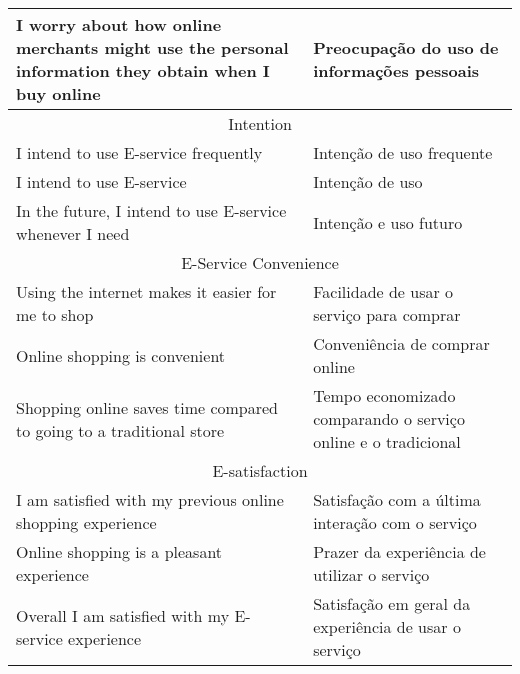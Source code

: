 \begin{apendicesenv}
\begin{table}[]
{\begin{tabular}{|l|l|}
I worry about how online merchants might use the personal information they obtain when I buy online & Preocupação do uso de informações pessoais \\ \hline
\multicolumn{2}{|c|}{\cellcolor[HTML]{C0C0C0}Intention} \\ \hline
I intend to use E-service frequently & Intenção de uso frequente \\ \hline
I intend to use E-service & Intenção de uso \\ \hline
In the future, I intend to use E-service whenever I need & Intenção e uso futuro \\ \hline
\multicolumn{2}{|c|}{\cellcolor[HTML]{C0C0C0}E-Service Convenience} \\ \hline
Using the internet makes it easier for me to shop & Facilidade de usar o serviço para comprar \\ \hline
Online shopping is convenient & Conveniência de comprar online \\ \hline
Shopping online saves time compared to going to a traditional store & Tempo economizado comparando o serviço online e o tradicional \\ \hline
\multicolumn{2}{|c|}{\cellcolor[HTML]{C0C0C0}E-satisfaction} \\ \hline
I am satisfied with my previous online shopping experience & Satisfação com a última interação com o serviço \\ \hline
Online shopping is a pleasant experience & Prazer da experiência de utilizar o serviço \\ \hline
Overall I am satisfied with my E-service experience & Satisfação em geral da experiência de usar o serviço \\ \hline
\end{tabular}%
}
\end{table}


\end{apendicesenv}
